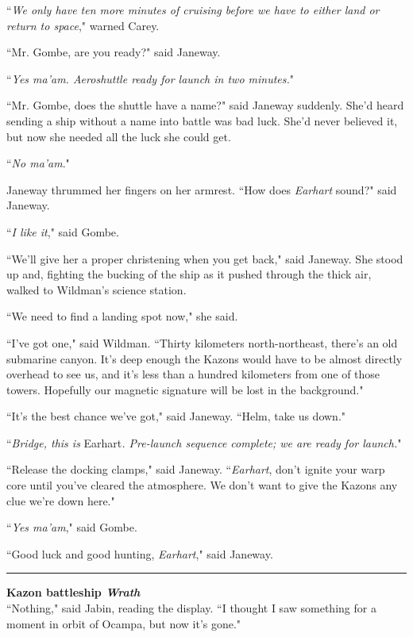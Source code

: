 \documentclass[twoside,letterpaper,12pt]{memoir}
\begin{document}
``\textit{We only have ten more minutes of cruising before we have to either land or return to space}," warned Carey.

``Mr. Gombe, are you ready?" said Janeway.

``\textit{Yes ma'am. Aeroshuttle ready for launch in two minutes.}"

``Mr. Gombe, does the shuttle have a name?" said Janeway suddenly. She'd heard sending a ship without a name into battle was bad luck. She'd never believed it, but now she needed all the luck she could get.

``\textit{No ma'am}."

Janeway thrummed her fingers on her armrest. ``How does \textit{Earhart} sound?" said Janeway.

``\textit{I like it}," said Gombe.

``We'll give her a proper christening when you get back," said Janeway. She stood up and, fighting the bucking of the ship as it pushed through the thick air, walked to Wildman's science station.

``We need to find a landing spot now," she said.

``I've got one," said Wildman. ``Thirty kilometers north-northeast, there's an old submarine canyon. It's deep enough the Kazons would have to be almost directly overhead to see us, and it's less than a hundred kilometers from one of those towers. Hopefully our magnetic signature will be lost in the background."

``It's the best chance we've got," said Janeway. ``Helm, take us down."

``\textit{Bridge, this is }Earhart\textit{. Pre-launch sequence complete; we are ready for launch.}"

``Release the docking clamps," said Janeway. ``\textit{Earhart}, don't ignite your warp core until you've cleared the atmosphere. We don't want to give the Kazons any clue we're down here."

``\textit{Yes ma'am}," said Gombe.

``Good luck and good hunting, \textit{Earhart}," said Janeway.

\begin{center}\rule{3cm}{0.4 pt}\end{center}

\noindent\textbf{Kazon battleship \textit{Wrath}}\\

``Nothing," said Jabin, reading the display. ``I thought I saw something for a moment in orbit of Ocampa, but now it’s gone."
\end{document}
